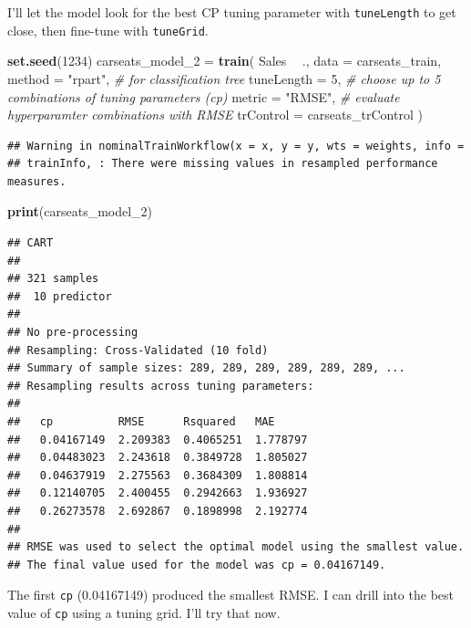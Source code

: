 \documentclass[]{book}
\newenvironment{Shaded}{\begin{snugshade}}{\end{snugshade}}
\newcommand{\CommentTok}[1]{\textcolor[rgb]{0.56,0.35,0.01}{\textit{#1}}}
\newcommand{\DataTypeTok}[1]{\textcolor[rgb]{0.13,0.29,0.53}{#1}}
\newcommand{\DecValTok}[1]{\textcolor[rgb]{0.00,0.00,0.81}{#1}}
\newcommand{\KeywordTok}[1]{\textcolor[rgb]{0.13,0.29,0.53}{\textbf{#1}}}
\newcommand{\NormalTok}[1]{#1}
\newcommand{\OperatorTok}[1]{\textcolor[rgb]{0.81,0.36,0.00}{\textbf{#1}}}
\newcommand{\StringTok}[1]{\textcolor[rgb]{0.31,0.60,0.02}{#1}}
\begin{document}
I'll let the model look for the best CP tuning parameter with \texttt{tuneLength} to get close, then fine-tune with \texttt{tuneGrid}.

\begin{Shaded}
\begin{Highlighting}[]
\KeywordTok{set.seed}\NormalTok{(}\DecValTok{1234}\NormalTok{)}
\NormalTok{carseats_model_}\DecValTok{2}\NormalTok{ =}\StringTok{ }\KeywordTok{train}\NormalTok{(}
\NormalTok{   Sales }\OperatorTok{~}\StringTok{ }\NormalTok{., }
   \DataTypeTok{data =}\NormalTok{ carseats_train, }
   \DataTypeTok{method =} \StringTok{"rpart"}\NormalTok{,  }\CommentTok{# for classification tree}
   \DataTypeTok{tuneLength =} \DecValTok{5}\NormalTok{,  }\CommentTok{# choose up to 5 combinations of tuning parameters (cp)}
   \DataTypeTok{metric =} \StringTok{"RMSE"}\NormalTok{,  }\CommentTok{# evaluate hyperparamter combinations with RMSE}
   \DataTypeTok{trControl =}\NormalTok{ carseats_trControl}
\NormalTok{)}
\end{Highlighting}
\end{Shaded}

\begin{verbatim}
## Warning in nominalTrainWorkflow(x = x, y = y, wts = weights, info =
## trainInfo, : There were missing values in resampled performance measures.
\end{verbatim}

\begin{Shaded}
\begin{Highlighting}[]
\KeywordTok{print}\NormalTok{(carseats_model_}\DecValTok{2}\NormalTok{)}
\end{Highlighting}
\end{Shaded}

\begin{verbatim}
## CART 
## 
## 321 samples
##  10 predictor
## 
## No pre-processing
## Resampling: Cross-Validated (10 fold) 
## Summary of sample sizes: 289, 289, 289, 289, 289, 289, ... 
## Resampling results across tuning parameters:
## 
##   cp          RMSE      Rsquared   MAE     
##   0.04167149  2.209383  0.4065251  1.778797
##   0.04483023  2.243618  0.3849728  1.805027
##   0.04637919  2.275563  0.3684309  1.808814
##   0.12140705  2.400455  0.2942663  1.936927
##   0.26273578  2.692867  0.1898998  2.192774
## 
## RMSE was used to select the optimal model using the smallest value.
## The final value used for the model was cp = 0.04167149.
\end{verbatim}

The first \texttt{cp} (0.04167149) produced the smallest RMSE. I can drill into the best value of \texttt{cp} using a tuning grid. I'll try that now.
\end{document}
